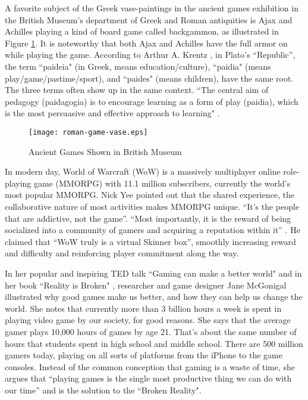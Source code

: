 A favorite subject of the Greek vase-paintings in the ancient games exhibition in the British Museum's department of Greek and Roman antiquities is Ajax and Achilles playing a kind of board game called backgammon, as illustrated in Figure \ref{fig:ancient-games}. It is noteworthy that both Ajax and Achilles have the full armor on while playing the game. According to Arthur A. Krentz \cite{krentz1998play}, in Plato's ``Republic'', the term ``paideia" (in Greek, means education/culture), ``paidia" (means play/game/pastime/sport), and ``paides" (means children), have the same root. The three terms often show up in the same context. ``The central aim of pedagogy (paidagogia) is to encourage learning as a form of play (paidia), which is the most persuasive and effective approach to learning" .

\begin{figure}[htbp]
	\centering
		\texttt{[image: roman-game-vase.eps]}
		\caption{Ancient Games Shown in British Museum}
		\label{fig:ancient-games}
\end{figure}

In modern day, World of Warcraft (WoW) is a massively multiplayer online role-playing game (MMORPG) with 11.1 million subscribers, currently the world's most popular MMORPG.  Nick Yee \cite {yee2002understanding} pointed out that the shared experience, the collaborative nature of most activities makes MMORPG unique. ``It's the people that are addictive, not the game''. ``Most importantly, it is the reward of being socialized into a community of gamers and acquiring a reputation within it''  . He claimed \cite {yee2001vsb} that ``WoW truly is a virtual Skinner box'', smoothly increasing reward and difficulty and reinforcing player commitment along the way.
	
In her popular and inspiring TED talk ``Gaming can make a better world" \cite {mcgonigal2010ted} and in her book ``Reality is Broken" \cite {mcgonigal2011reality}, researcher and game designer Jane McGonigal illustrated why good games make us better, and how they can help us change the world. She notes that currently more than 3 billion hours a week is spent in playing video game by our society, for good reasons. She says that the average gamer plays 10,000 hours of games by age 21. That's about the same number of hours that students spent in high school and middle school. There are 500 million gamers today, playing on all sorts of platforms from the iPhone to the game consoles. Instead of the common conception that gaming is a waste of time, she argues that ``playing games is the single most productive thing we can do with our time'' and is the solution to the ``Broken Reality". 

